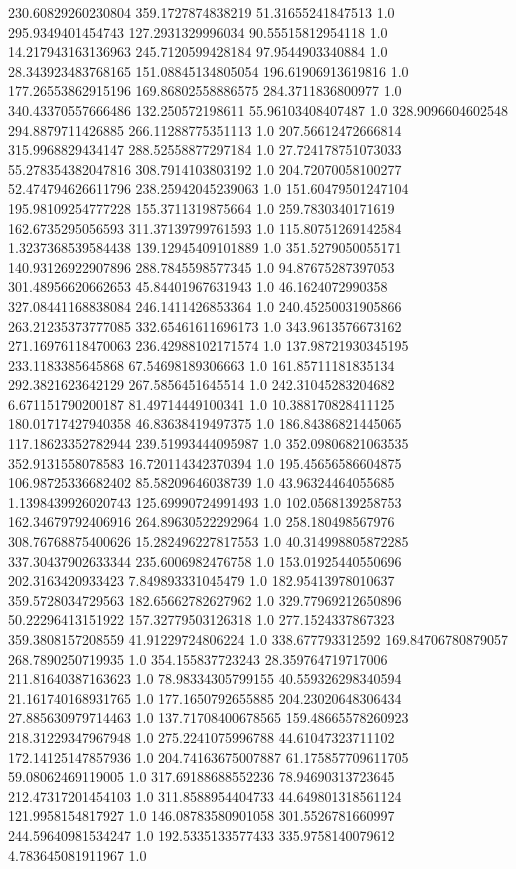 230.60829260230804	359.1727874838219	51.31655241847513	1.0
295.9349401454743	127.2931329996034	90.55515812954118	1.0
14.217943163136963	245.7120599428184	97.9544903340884	1.0
28.343923483768165	151.08845134805054	196.61906913619816	1.0
177.26553862915196	169.86802558886575	284.3711836800977	1.0
340.43370557666486	132.250572198611	55.96103408407487	1.0
328.9096604602548	294.8879711426885	266.11288775351113	1.0
207.56612472666814	315.9968829434147	288.52558877297184	1.0
27.724178751073033	55.278354382047816	308.7914103803192	1.0
204.72070058100277	52.474794626611796	238.25942045239063	1.0
151.60479501247104	195.98109254777228	155.3711319875664	1.0
259.7830340171619	162.6735295056593	311.37139799761593	1.0
115.80751269142584	1.3237368539584438	139.12945409101889	1.0
351.5279050055171	140.93126922907896	288.7845598577345	1.0
94.87675287397053	301.48956620662653	45.84401967631943	1.0
46.1624072990358	327.08441168838084	246.1411426853364	1.0
240.45250031905866	263.21235373777085	332.65461611696173	1.0
343.9613576673162	271.16976118470063	236.42988102171574	1.0
137.98721930345195	233.1183385645868	67.54698189306663	1.0
161.85711181835134	292.3821623642129	267.5856451645514	1.0
242.31045283204682	6.671151790200187	81.49714449100341	1.0
10.388170828411125	180.01717427940358	46.83638419497375	1.0
186.84386821445065	117.18623352782944	239.51993444095987	1.0
352.09806821063535	352.9131558078583	16.720114342370394	1.0
195.45656586604875	106.98725336682402	85.58209646038739	1.0
43.96324464055685	1.1398439926020743	125.69990724991493	1.0
102.0568139258753	162.34679792406916	264.89630522292964	1.0
258.180498567976	308.76768875400626	15.282496227817553	1.0
40.314998805872285	337.30437902633344	235.6006982476758	1.0
153.01925440550696	202.3163420933423	7.849893331045479	1.0
182.95413978010637	359.5728034729563	182.65662782627962	1.0
329.77969212650896	50.22296413151922	157.32779503126318	1.0
277.1524337867323	359.3808157208559	41.91229724806224	1.0
338.677793312592	169.84706780879057	268.7890250719935	1.0
354.155837723243	28.359764719717006	211.81640387163623	1.0
78.98334305799155	40.559326298340594	21.161740168931765	1.0
177.1650792655885	204.23020648306434	27.885630979714463	1.0
137.71708400678565	159.48665578260923	218.31229347967948	1.0
275.2241075996788	44.61047323711102	172.14125147857936	1.0
204.74163675007887	61.175857709611705	59.08062469119005	1.0
317.69188688552236	78.94690313723645	212.47317201454103	1.0
311.8588954404733	44.649801318561124	121.9958154817927	1.0
146.08783580901058	301.5526781660997	244.59640981534247	1.0
192.5335133577433	335.9758140079612	4.783645081911967	1.0
